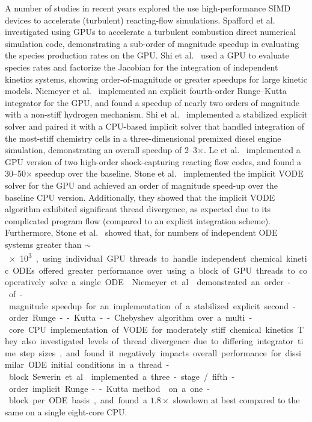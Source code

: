 \documentclass[preprint]{elsarticle}
\begin{document}
A number of studies in recent years explored the use high-performance SIMD devices to accelerate (turbulent) reacting-flow simulations.
Spafford et al.~\cite{Spafford:2010aa} investigated using GPUs to accelerate a turbulent combustion direct numerical simulation code, demonstrating a sub-order of magnitude speedup in evaluating the species production rates on the GPU.
Shi et al.~\cite{Shi:2011aa} used a GPU to evaluate species rates and factorize the Jacobian for the integration of independent kinetics systems, showing order-of-magnitude or greater speedups for large kinetic models.
Niemeyer et al.~\cite{Niemeyer:2011aa} implemented an explicit fourth-order Runge--Kutta integrator for the GPU, and found a speedup of nearly two orders of magnitude with a non-stiff hydrogen mechanism.
Shi et al.~\cite{Shi:2012aa} implemented a stabilized explicit solver and paired it with a CPU-based implicit solver that handled integration of the most-stiff chemistry cells in a three-dimensional premixed diesel engine simulation, demonstrating an overall speedup of \numrange{2}{3}$\times$.
Le et al.~\cite{Le2013596} implemented a GPU version of two high-order shock-capturing reacting flow codes, and found a \numrange{30}{50}$\times$ speedup over the baseline.
Stone et al.~\cite{Stone:2013aa} implemented the implicit VODE~\cite{brown1989vode} solver for the GPU and achieved an order of magnitude speed-up over the baseline CPU version.
Additionally, they showed that the implicit VODE algorithm exhibited significant thread divergence, as expected due to its complicated program flow (compared to an explicit integration scheme).
Furthermore, Stone et al.~\cite{Stone:2013aa} showed that, for numbers of independent ODE systems greater than $\sim$\SI{e3}, using individual GPU threads to handle independent chemical kinetic ODEs offered greater performance over using a block of GPU threads to cooperatively solve a single ODE~\cite{Stone:2013aa}.
Niemeyer et al.~\cite{Niemeyer:2014aa} demonstrated an order-of-magnitude speedup for an implementation of a stabilized explicit second-order Runge--Kutta--Chebyshev algorithm over a multi-core CPU implementation of VODE for moderately stiff chemical kinetics.
They also investigated levels of thread divergence due to differing integrator time step sizes, and found it negatively impacts overall performance for dissimilar ODE initial conditions in a thread-block.
Sewerin et al.~\cite{Sewerin20151375} implemented a three-stage\slash fifth-order implicit Runge--Kutta method~\cite{wanner1991solving} on a one-block per ODE basis, and found a $1.8\times$ slowdown at best compared to the same on a single eight-core CPU.
\end{document}
